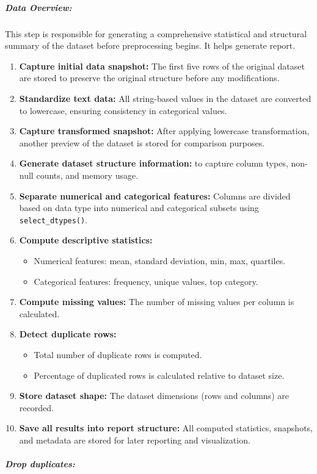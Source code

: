 
\subparagraph{Data Overview:}

This step is responsible for generating a comprehensive statistical and structural summary of the dataset before preprocessing begins. It helps generate report.

\begin{enumerate}
    \item \textbf{Capture initial data snapshot:} The first five rows of the original dataset are stored to preserve the original structure before any modifications.

    \item \textbf{Standardize text data:} All string-based values in the dataset are converted to lowercase, ensuring consistency in categorical values.

    \item \textbf{Capture transformed snapshot:} After applying lowercase transformation, another preview of the dataset is stored for comparison purposes.

    \item \textbf{Generate dataset structure information:} to capture column types, non-null counts, and memory usage.

    \item \textbf{Separate numerical and categorical features:} Columns are divided based on data type into numerical and categorical subsets using \texttt{select\_dtypes()}.

    \item \textbf{Compute descriptive statistics:}
    \begin{itemize}
        \item Numerical features: mean, standard deviation, min, max, quartiles.
        \item Categorical features: frequency, unique values, top category.
    \end{itemize}

    \item \textbf{Compute missing values:} The number of missing values per column is calculated.

    \item \textbf{Detect duplicate rows:}
    \begin{itemize}
        \item Total number of duplicate rows is computed.
        \item Percentage of duplicated rows is calculated relative to dataset size.
    \end{itemize}

    \item \textbf{Store dataset shape:} The dataset dimensions (rows and columns) are recorded.

    \item \textbf{Save all results into report structure:} All computed statistics, snapshots, and metadata are stored for later reporting and visualization.
\end{enumerate}

\subparagraph{Drop duplicates:}

